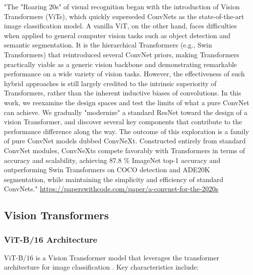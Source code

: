 "The "Roaring 20s" of visual recognition began with the introduction of Vision Transformers (ViTs), which quickly superseded ConvNets as the state-of-the-art image classification model. A vanilla ViT, on the other hand, faces difficulties when applied to general computer vision tasks such as object detection and semantic segmentation. It is the hierarchical Transformers (e.g., Swin Transformers) that reintroduced several ConvNet priors, making Transformers practically viable as a generic vision backbone and demonstrating remarkable performance on a wide variety of vision tasks. However, the effectiveness of such hybrid approaches is still largely credited to the intrinsic superiority of Transformers, rather than the inherent inductive biases of convolutions. In this work, we reexamine the design spaces and test the limits of what a pure ConvNet can achieve. We gradually "modernize" a standard ResNet toward the design of a vision Transformer, and discover several key components that contribute to the performance difference along the way. The outcome of this exploration is a family of pure ConvNet models dubbed ConvNeXt. Constructed entirely from standard ConvNet modules, ConvNeXts compete favorably with Transformers in terms of accuracy and scalability, achieving 87.8 \% ImageNet top-1 accuracy and outperforming Swin Transformers on COCO detection and ADE20K segmentation, while maintaining the simplicity and efficiency of standard ConvNets." \url{https://paperswithcode.com/paper/a-convnet-for-the-2020s}


\subsection{Vision Transformers}


\subsubsection{ViT-B/16 Architecture}
ViT-B/16 is a Vision Transformer model that leverages the transformer architecture for image classification \cite{dosovitskiy2021imageworth16x16words}. Key characteristics include:

